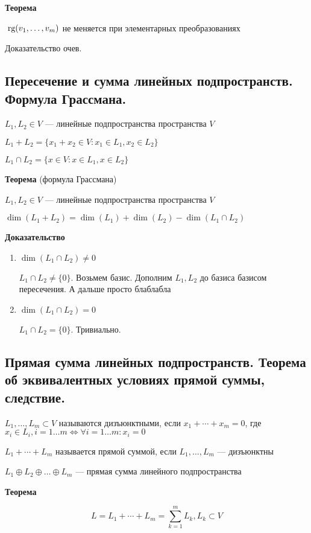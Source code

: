 \textbf{Теорема}

\(\rg (v_1, \ldots, v_m)\) не меняется при элементарных преобразованиях

Доказательство очев.

\subsection{Пересечение и сумма линейных подпространств. Формула Грассмана.}
\(L_1, L_2 \in V\) --- линейные подпространства пространства \(V\)

\(L_1 + L_2 = \{ x_1 + x_2 \in V : x_1 \in L_1, x_2 \in L_2 \}\)

\(L_1 \cap L_2 = \{ x \in V : x \in L_1, x \in L_2 \}\)

\textbf{Теорема} (формула Грассмана)

\(L_1, L_2 \in V\) --- линейные подпространства пространства \(V\)

\(\dim (L_1 + L_2) = \dim (L_1) + \dim (L_2) - \dim (L_1 \cap L_2)\)

\textbf{Доказательство}



\begin{enumerate}
    \item \(\dim (L_1 \cap L_2) \neq 0\)

          \(L_1 \cap L_2 \neq \{0\}\). Возьмем базис. Дополним $L_1,L_2$ до базиса базисом пересечения. А дальше просто блаблабла

    \item \(\dim(L_1 \cap L_2) = 0\)

          \(L_1 \cap L_2 = \{0\}\). Тривиально.
\end{enumerate}

\subsection{Прямая сумма линейных подпространств. Теорема об эквивалентных условиях прямой суммы, следствие.}
\(L_1, \ldots, L_m \subset V\) называются дизъюнктными, если \(x_1 + \cdots + x_m = 0\), где \(x_i \in L_i, i = 1 \ldots m \Leftrightarrow \forall i = 1 \ldots m: x_i = 0\)

\(L_1 + \cdots + L_m\) называется прямой суммой, если \(L_1, \ldots, L_m\) --- дизъюнктны

\(L_1 \oplus L_2 \oplus \ldots \oplus L_m\) --- прямая сумма линейного подпространства

\textbf{Теорема}

\[
    L = L_1 + \cdots + L_m = \sum\limits_{k = 1}^{m} L_k, L_k \subset V
\]

